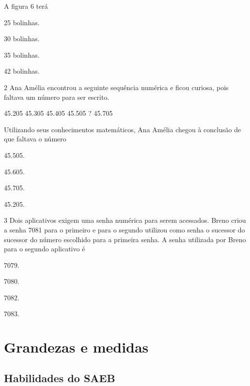  A figura 6 terá

\begin{escolha}
\item
  25 bolinhas.
\item
  30 bolinhas.
\item
  35 bolinhas.
\item
  42 bolinhas.
\end{escolha}

\pagebreak
\num{2} Ana Amélia encontrou a seguinte sequência numérica e ficou curiosa, pois
faltava um número para ser escrito.

\begin{mdframed}[linewidth=2pt,linecolor=azul!20,backgroundcolor=azul!20,roundcorner=2pt]
45.205 \hfill 45.305 \hfill 45.405 \hfill 45.505 \hfill ? \hfill 45.705 \hfill
\end{mdframed}

Utilizando seus conhecimentos matemáticos, Ana Amélia chegou à conclusão de que
faltava o número

\begin{escolha}
\item
  45.505.
\item
  45.605.
\item
  45.705.
\item
  45.205.
\end{escolha}

\num{3} Dois aplicativos exigem uma senha numérica para serem acessados. Breno
criou a senha 7081 para o primeiro e para o segundo utilizou como senha
o sucessor do sucessor do número escolhido para a primeira senha. A
senha utilizada por Breno para o segundo aplicativo é

\begin{escolha}
\item
  7079.
\item
  7080.
\item
  7082.
\item
  7083.
\end{escolha}

\chapter{Grandezas e medidas}

\section{Habilidades do SAEB}

